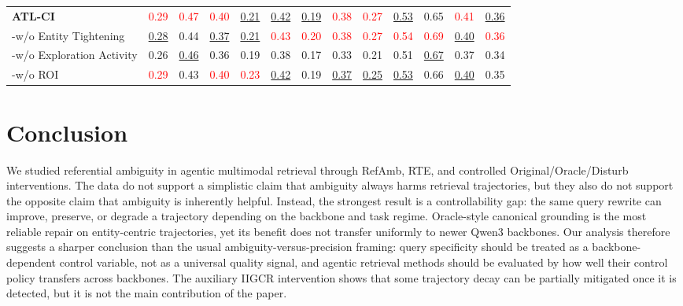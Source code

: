 \documentclass{article} %
\begin{document}
\begin{table}[htbp]
{\begin{tabular}{l|cc|cc|cc|cc|cc|cc}
\textbf{ATL-CI} & \textcolor{red}{0.29} & \textcolor{red}{0.47} & \textcolor{red}{0.40} & \underline{0.21} & \underline{0.42} & \underline{0.19} & \textcolor{red}{0.38} & \textcolor{red}{0.27} & \underline{0.53} & 0.65 & \textcolor{red}{0.41} & \underline{0.36} \\
\quad -w/o Entity Tightening & \underline{0.28} & 0.44 & \underline{0.37} & \underline{0.21} & \textcolor{red}{0.43} & \textcolor{red}{0.20} & \textcolor{red}{0.38} & \textcolor{red}{0.27} & \textcolor{red}{0.54} & \textcolor{red}{0.69} & \underline{0.40} & \textcolor{red}{0.36} \\
\quad -w/o Exploration Activity & 0.26 & \underline{0.46} & 0.36 & 0.19 & 0.38 & 0.17 & 0.33 & 0.21 & 0.51 & \underline{0.67} & 0.37 & 0.34 \\
\quad -w/o ROI & \textcolor{red}{0.29} & 0.43 & \textcolor{red}{0.40} & \textcolor{red}{0.23} & \underline{0.42} & 0.19 & \underline{0.37} & \underline{0.25} & \underline{0.53} & 0.66 & \underline{0.40} & 0.35 \\
\bottomrule
\end{tabular}%
}
\label{tab:main-baselines-tasktype-rte-lj}
\end{table}




\section{Conclusion}
We studied referential ambiguity in agentic multimodal retrieval through RefAmb, RTE, and controlled Original/Oracle/Disturb interventions.
The data do not support a simplistic claim that ambiguity always harms retrieval trajectories, but they also do not support the opposite claim that ambiguity is inherently helpful.
Instead, the strongest result is a controllability gap: the same query rewrite can improve, preserve, or degrade a trajectory depending on the backbone and task regime.
Oracle-style canonical grounding is the most reliable repair on entity-centric trajectories, yet its benefit does not transfer uniformly to newer Qwen3 backbones.
Our analysis therefore suggests a sharper conclusion than the usual ambiguity-versus-precision framing: query specificity should be treated as a backbone-dependent control variable, not as a universal quality signal, and agentic retrieval methods should be evaluated by how well their control policy transfers across backbones.
The auxiliary IIGCR intervention shows that some trajectory decay can be partially mitigated once it is detected, but it is not the main contribution of the paper.
\end{document}
